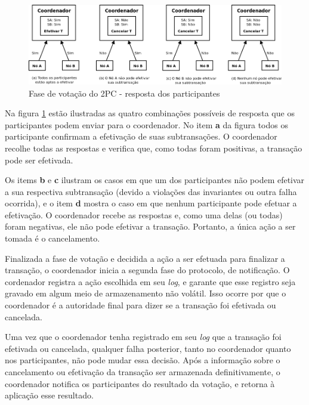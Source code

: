 \documentclass[11pt,twoside,a4paper]{book}
\begin{document}
\begin{figure}
  \centering
  \includegraphics[width=\textwidth]{fase_votacao_2pc_respostas} 
  \caption{Fase de votação do 2PC - resposta dos participantes}
  \label{fig:fase_votacao_2pc_respostas} 
\end{figure}

Na figura \ref{fig:fase_votacao_2pc_respostas} estão ilustradas as quatro combinações possíveis de resposta que os participantes podem enviar para o coordenador. No item \textbf{a} da figura todos os participante confirmam a efetivação de suas subtransações. O coordenador recolhe todas as respostas e verifica que, como todas foram positivas, a transação pode ser efetivada.

Os items \textbf{b} e \textbf{c} ilustram os casos em que um dos participantes não podem efetivar a sua respectiva subtransação (devido a violações das invariantes ou outra falha ocorrida), e o item \textbf{d} mostra o caso em que nenhum participante pode efetuar a efetivação. O coordenador recebe as respostas e, como uma delas (ou todas) foram negativas, ele não pode efetivar a transação. Portanto, a única ação a ser tomada é o cancelamento.

Finalizada a fase de votação e decidida a ação a ser efetuada para finalizar a transação, o coordenador inicia a segunda fase do protocolo, de notificação. O cordenador registra a ação escolhida em seu \emph{log}, e garante que esse registro seja gravado em algum meio de armazenamento não volátil. Isso ocorre por que o coordenador é a autoridade final para dizer se a transação foi efetivada ou cancelada. 

Uma vez que o coordenador tenha registrado em seu \emph{log} que a transação foi efetivada ou cancelada, qualquer falha posterior, tanto no coordenador quanto nos participantes, não pode mudar essa decisão. Após a informação sobre o cancelamento ou efetivação da transação ser armazenada definitivamente, o coordenador notifica os participantes do resultado da votação, e retorna à aplicação esse resultado.
\end{document}
